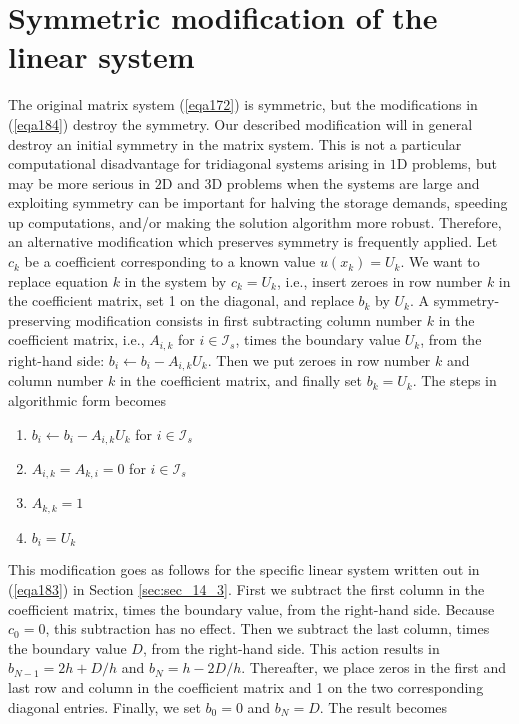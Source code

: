 \documentclass[../main.tex]{subfiles}
\begin{document}
	\section[Symmetric modification of the linear system]{Symmetric modification of the linear system}
		\label{sec:sec_14_4}
		The original matrix system (\ref{eqa172}) is symmetric, but the modifications in (\ref{eqa184}) destroy the symmetry. Our described modification will in general destroy an initial symmetry in the matrix system. This is not a particular computational disadvantage for tridiagonal systems arising in $1 \mathrm{D}$ problems, but may be more serious in $2 \mathrm{D}$ and 3D problems when the systems are large and exploiting symmetry can be important for halving the storage demands, speeding up computations, and/or making the solution algorithm more robust. Therefore, an alternative modification which preserves symmetry is frequently applied.\smallbreak
		Let $c_{k}$ be a coefficient corresponding to a known value $u\left(x_{k}\right)=U_{k}$. We want to replace equation $k$ in the system by $c_{k}=U_{k}$, i.e., insert zeroes in row number $k$ in the coefficient matrix, set 1 on the diagonal, and replace $b_{k}$ by $U_{k}$. A symmetry-preserving modification consists in first subtracting column number $k$ in the coefficient matrix, i.e., $A_{i, k}$ for $i \in \mathcal{I}_{s}$, times the boundary value $U_{k}$, from the right-hand side: $b_{i} \leftarrow b_{i}-A_{i, k} U_{k}$. Then we put zeroes in row number $k$ and column number $k$ in the coefficient matrix, and finally set $b_{k}=U_{k}$. The steps in algorithmic form becomes
		\begin{enumerate}
			\item $b_{i} \leftarrow b_{i}-A_{i, k} U_{k}$ for $i \in \mathcal{I}_{s}$ \bigbreak
			\item $A_{i, k}=A_{k, i}=0$ for $i \in \mathcal{I}_{s}$ \bigbreak
			\item $A_{k, k}=1$ \bigbreak
			\item $b_{i}=U_{k}$ \bigbreak
		\end{enumerate}
		
		\noindent This modification goes as follows for the specific linear system written out in (\ref{eqa183}) in Section \ref{sec:sec_14_3}. First we subtract the first column in the coefficient matrix, times the boundary value, from the right-hand side. Because $c_{0}=0$, this subtraction has no effect. Then we subtract the last column, times the boundary value $D$, from the right-hand side. This action results in $b_{N-1}=2 h+D / h$ and $b_{N}=h-2 D / h$. Thereafter, we place zeros in the first and last row and column in the coefficient matrix and 1 on the two corresponding diagonal entries. Finally, we set $b_{0}=0$ and $b_{N}=D$. The result becomes
		
\end{document}
